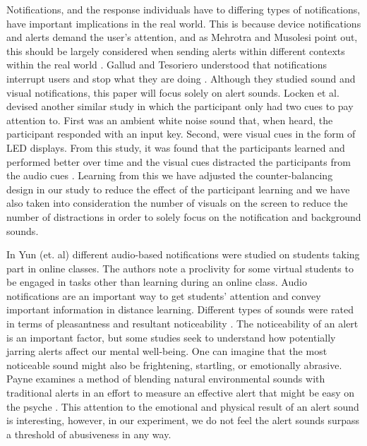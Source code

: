 \documentclass[manuscript,screen,review]{acmart}
\begin{document}
Notifications, and the response individuals have to differing types of notifications, have important implications in the real world. This is because device notifications and alerts demand the user's attention, and as Mehrotra and Musolesi point out, this should be largely considered when sending alerts within different contexts within the real world \cite{10.1145/2750858.2807544}. Gallud and Tesoriero understood that notifications interrupt users and stop what they are doing \cite{10.1145/2786567.2793706}.  Although they studied sound and visual notifications, this paper will focus solely on alert sounds. Locken et al. devised another similar study in which the participant only had two cues to pay attention to. First was an ambient white noise sound that, when heard, the participant responded with an input key. Second, were visual cues in the form of LED displays. From this study, it was found that the participants learned and performed better over time and the visual cues distracted the participants from the audio cues \cite{10.1145/3119881.3119894}. Learning from this we have adjusted the counter-balancing design in our study to reduce the effect of the participant learning and we have also taken into consideration the number of visuals on the screen to reduce the number of distractions in order to solely focus on the notification and background sounds. 

In Yun (et. al) different audio-based notifications were studied on students taking part in online classes. The authors note a proclivity for some virtual students to be engaged in tasks other than learning during an online class. Audio notifications are an important way to get students' attention and convey important information in distance learning. Different types of sounds were rated in terms of pleasantness and resultant noticeability \cite{yun2022exploring}. The noticeability of an alert is an important factor, but some studies seek to understand how potentially jarring alerts affect our mental well-being. One can imagine that the most noticeable sound might also be frightening, startling, or emotionally abrasive. Payne examines a method of blending natural environmental sounds with traditional alerts in an effort to measure an effective alert that might be easy on the psyche \cite{payne2016ambient}. This attention to the emotional and physical result of an alert sound is interesting, however, in our experiment, we do not feel the alert sounds surpass a threshold of abusiveness in any way.
\end{document}
